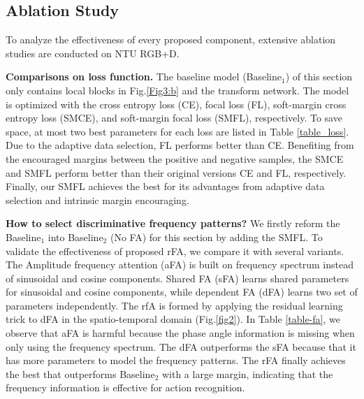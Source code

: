 \documentclass{article}
\begin{document}
\subsection{Ablation Study}
To analyze the effectiveness of every proposed component, extensive ablation studies are conducted on NTU RGB+D.




\noindent\textbf{Comparisons on loss function.}
The baseline model (Baseline$_1$) of this section only contains local blocks in Fig.\ref{Fig3:b} and the transform network. The model is optimized with the cross entropy loss (CE), focal loss (FL), soft-margin cross entropy loss (SMCE), and soft-margin focal loss (SMFL), respectively. To save space, at most two best parameters for each loss are listed in Table \ref{table_loss}. Due to the adaptive data selection, FL performs better than CE. Benefiting from the encouraged margins between the positive and negative samples, the SMCE and SMFL perform better than their original versions CE and FL, respectively. Finally, our SMFL achieves the best for its advantages from adaptive data selection and intrinsic margin encouraging.

\noindent\textbf{How to select discriminative frequency patterns?} We firstly reform the Baseline$_1 $ into Baseline$_2 $ (No FA) for this section by adding the SMFL. To validate the effectiveness of proposed rFA, we compare it with several variants. The Amplitude frequency attention (aFA) is built on frequency spectrum instead of sinusoidal and cosine components. Shared FA (sFA) learns shared parameters for sinusoidal and cosine components, while dependent FA (dFA) learns two set of parameters independently. The rfA is formed by applying the residual learning trick to dFA in the spatio-temporal domain (Fig.\ref{fig2}). In Table \ref{table-fa}, we observe that aFA is harmful because the phase angle information is missing when only using the frequency spectrum. The dFA outperforms the sFA because that it has more parameters to model the frequency patterns. The rFA finally achieves the best that outperforms Baseline$_2$ with a large margin, indicating that the frequency information is effective for action recognition.
\end{document}
